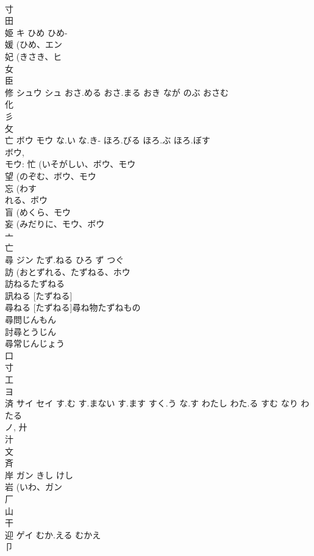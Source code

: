 \documentclass[8pt]{extreport}
\begin{document}
\begin{CJK}{UTF8}{min}
\\	寸 
\\	田 
\\	姫	キ	ひめ ひめ-	
\\	媛 (ひめ、エン 
\\	妃 (きさき、ヒ 
\\	女 
\\	臣 
\\	修	シュウ シュ	おさ.める おさ.まる おき なが のぶ おさむ	
\\	化 
\\	彡 
\\	攵 
\\	亡	ボウ モウ	な.い な.き- ほろ.びる ほろ.ぶ ほろ.ぼす	
\\	ボウ, 
\\	モウ: 忙 (いそがしい、ボウ、モウ 
\\	望 (のぞむ、ボウ、モウ 
\\	忘 (わす
\\	れる、ボウ 
\\	盲 (めくら、モウ 
\\	妄 (みだりに、モウ、ボウ 
\\	亠 
\\	亡 
\\	尋	ジン	たず.ねる ひろ ず つぐ	
\\	訪 (おとずれる、たずねる、ホウ 
\\	訪ねるたずねる
\\	訊ねる [たずねる] 
\\	尋ねる [たずねる]尋ね物たずねもの
\\	尋問じんもん
\\	討尋とうじん
\\	尋常じんじょう
\\	口 
\\	寸 
\\	工 
\\	ヨ	
\\	済	サイ セイ	す.む す.まない す.ます すく.う な.す わたし わた.る すむ なり わたる	
\\	ノ, 廾 
\\	汁 
\\	文 
\\	斉 
\\	岸	ガン	きし けし	
\\	岩 (いわ、ガン 
\\	厂 
\\	山 
\\	干 
\\	迎	ゲイ	むか.える むかえ	
\\	卩 

\end{CJK}
\end{document}
